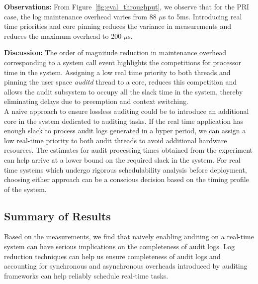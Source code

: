 \textbf{Observations:} From Figure~\ref{fig:eval_throughput}, we observe that for the PRI case, the log maintenance overhead varies from 88 $\mu$s to 5ms. Introducing real time priorities and core pinning reduces the variance in measurements and reduces the maximum overhead to 200 $\mu$s.
 
\textbf{Discussion:} %
The order of magnitude reduction in maintenance overhead corresponding to a system call event highlights the competitions for processor time in the system. Assigning a low real time priority to both threads and pinning the user space \textit{auditd} thread to a core, reduces this competition and allows the audit subsystem to occupy all the slack time in the system, thereby eliminating delays due to preemption and context switching.\\
A naive approach to ensure lossless auditing could be to introduce an additional core in the system dedicated to auditing tasks. If the real time application has enough slack to process audit logs generated in a hyper period, we can assign a low real-time priority to both audit threads to avoid additional hardware resources. The estimates for audit processing times obtained from the experiment can help arrive at a lower bound on the required slack in the system. For real time systems which undergo rigorous schedulability analysis before deployment, choosing either approach can be a conscious decision based on the timing profile of the system.

\subsection{Summary of Results}
Based on the measurements, we find that naively enabling auditing on a real-time system can have serious implications on the completeness of audit logs. Log reduction techniques can help us ensure completeness of audit logs and accounting for synchronous and asynchronous overheads introduced by auditing frameworks can help reliably schedule real-time tasks. %